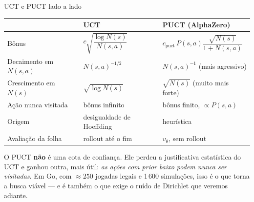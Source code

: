 \documentclass[aspectratio=169, 10pt]{beamer}
\newcommand{\cpuct}{c_{\mathrm{puct}}}
\newcommand{\Nvis}{N}
\newcommand{\redeval}{v_{\theta}}
\begin{document}
\begin{frame}{UCT e PUCT lado a lado}
  \small
  \begin{center}
  \begin{tabular}{lll}
    \toprule
     & \textbf{UCT} & \textbf{PUCT (AlphaZero)} \\
    \midrule
    Bônus & $c\sqrt{\dfrac{\log \Nvis(s)}{\Nvis(s,a)}}$ & $\cpuct\,P(s,a)\dfrac{\sqrt{\Nvis(s)}}{1+\Nvis(s,a)}$ \\[1.1em]
    Decaimento em $\Nvis(s,a)$ & $\Nvis(s,a)^{-1/2}$ & $\Nvis(s,a)^{-1}$ (mais agressivo) \\
    Crescimento em $\Nvis(s)$ & $\sqrt{\log \Nvis(s)}$ & $\sqrt{\Nvis(s)}$ (muito mais forte) \\
    Ação nunca visitada & bônus infinito & bônus finito, $\propto P(s,a)$ \\
    Origem & desigualdade de Hoeffding & \alert{heurística} \\
    Avaliação da folha & rollout até o fim & $\redeval$, sem rollout \\
    \bottomrule
  \end{tabular}
  \end{center}

  \begin{alertabox}
    O PUCT \textbf{não} é uma cota de confiança. Ele perdeu a justificativa
    estatística do UCT e ganhou outra, mais útil: \emph{as ações com prior baixo
    podem nunca ser visitadas}. Em Go, com $\approx 250$ jogadas legais e 1\,600
    simulações, isso é o que torna a busca viável — e é também o que exige o ruído
    de Dirichlet que veremos adiante.
  \end{alertabox}
\end{frame}
\end{document}
